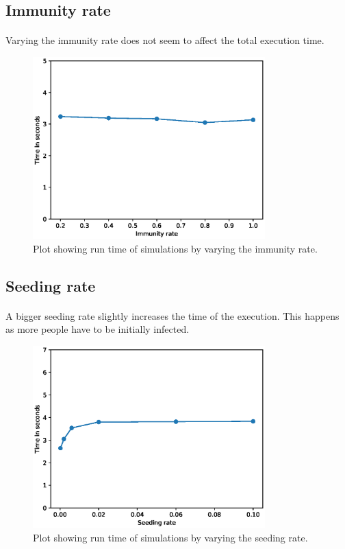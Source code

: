 \documentclass[runningheads]{llncs}
\begin{document}
\subsection{Immunity rate}

\paragraph{} Varying the immunity rate does not seem to affect the total execution time.
\begin{figure}[h!]
\centering
	\includegraphics[width=0.8\textwidth]{3_Performance_Profiling/3_immunityrate.eps}
	\caption{Plot showing run time of simulations by varying the immunity rate.} 
	\label{Gprof_immunityrate}
\end{figure}

\subsection{Seeding rate}

\paragraph{} A bigger seeding rate slightly increases the time of the execution. This happens as more people have to be initially infected.
\begin{figure}[h!]
\centering
	\includegraphics[width=0.8\textwidth]{3_Performance_Profiling/3_seedingrate.eps}
	\caption{Plot showing run time of simulations by varying the seeding rate.} 
	\label{Gprof_seedingrate}
\end{figure}
\end{document}
